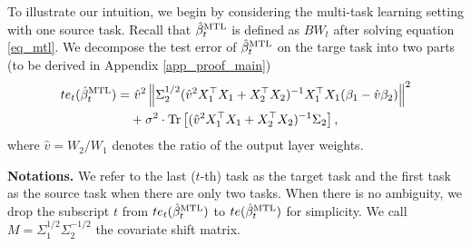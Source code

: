 To illustrate our intuition, we begin by considering the multi-task learning setting with one source task.
Recall that $\hat{\beta}_t^{\text{MTL}}$ is defined as $BW_t$ after solving equation \eqref{eq_mtl}.
We decompose the test error of $\hat{\beta}_{t}^{\text{MTL}}$ on the targe task into two parts (to be derived in Appendix \ref{app_proof_main})
\begin{align}
	te_t(\hat{\beta}_t^{\text{MTL}}) =& ~ \hat{v}^2 \left\| \Sigma_2^{1/2} (\hat{v}^2 X_1^{\top}X_1 + X_2^{\top}X_2)^{-1}X_1^{\top}X_1 (\beta_1 - \hat{v}\beta_2) \right\|^2 \label{eq_te_model_shift} \\
	&+ \sigma^2\cdot \operatorname{Tr}\left[(\hat{v}^2 X_1^{\top}X_1 + X_2^{\top}X_2)^{-1}\Sigma_2\right], \label{eq_te_var}
\end{align}
where $\hat{v} = W_2 / W_1$ denotes the ratio of the output layer weights.

\textbf{Notations.} We refer to the last ($t$-th) task as the target task and the first task as the source task when there are only two tasks.
When there is no ambiguity, we drop the subscript $t$ from $te_t(\hat{\beta}_t^{\text{MTL}})$ to $te(\hat{\beta}_t^{\text{MTL}})$ for simplicity.
We call $M = \Sigma_1^{1/2}\Sigma_2^{-1/2}$ the covariate shift matrix.
